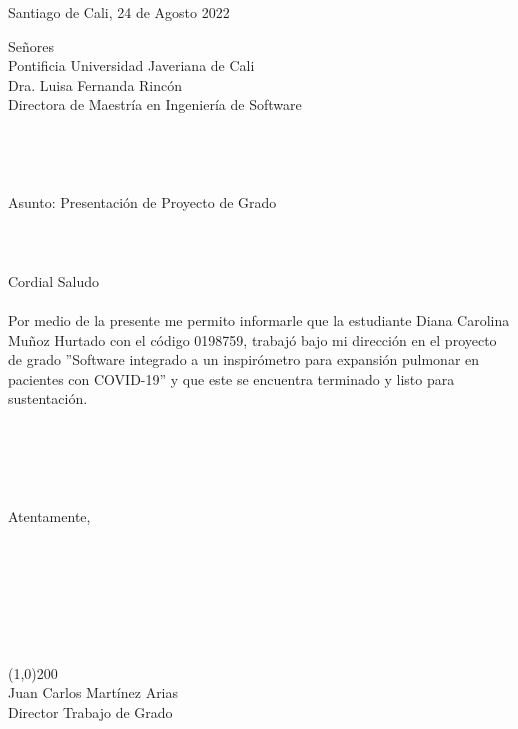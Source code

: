 \begin{flushright}
Santiago de Cali, 24 de Agosto 2022
\end{flushright}
Señores\\
Pontificia Universidad Javeriana de Cali\\
Dra. Luisa Fernanda Rincón\\
Directora de Maestría en Ingeniería de Software \\\\
\\
\\
\\

Asunto: Presentación de Proyecto de Grado\\
\\
\\
\\
Cordial Saludo\\
\\
Por medio de la presente me permito informarle que la estudiante Diana Carolina Muñoz Hurtado con el código 0198759, trabajó bajo mi dirección en el proyecto de grado ''Software integrado a un inspirómetro para expansión pulmonar en pacientes con COVID-19'' y que este se encuentra terminado y listo para sustentación.\\
\\
\\
\\
\\
\\
Atentamente,\\\\\\
\\
\\
\\
\\
\\

\line(1,0){200} \\
Juan Carlos Martínez Arias\\
Director Trabajo de Grado\\





\newpage
